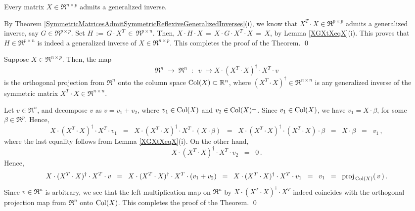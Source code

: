 \begin{theorem}
\mbox{}\vskip 0.1cm\noindent
Every matrix $X \in \Re^{n \times p}$ admits a generalized inverse.
\end{theorem}
\proof
By Theorem \ref{SymmetricMatricesAdmitSymmetricReflexiveGeneralizedInverses}(i),
we know that $X^{T} \cdot X \in \Re^{p \times p}$ admits a generalized inverse, say $G \in \Re^{p \times p}$.
Set $H \,:=\, G \cdot X^{T} \,\in\, \Re^{p \times n}$.
Then, $X \cdot H \cdot X \,=\, X \cdot G \cdot X^{T} \cdot X \,=\, X$, by Lemma \ref{XGXtXeqX}(i).
This proves that $H \in \Re^{p \times n}$ is indeed a generalized inverse of $X \in \Re^{n \times p}$.
This completes the proof of the Theorem.
\qed

\begin{theorem}
\mbox{}\vskip 0.1cm\noindent
Suppose $X \in \Re^{n \times p}$.
Then, the map
\begin{equation*}
\Re^{n} \; \longrightarrow \; \Re^{n}
\;\; : \;\;
v \; \longmapsto X \cdot (X^{T} \cdot X)^{\dagger} \cdot X^{T} \cdot v
\end{equation*}
is the orthogonal projection from $\Re^{n}$ onto the column space
$\textnormal{Col}(X) \subset \mathbb{R}^{n}$, where
$(X^{T} \cdot X)^{\dagger} \in \Re^{n \times n}$ is any generalized inverse of the symmetric
matrix $X^{T} \cdot X \in \Re^{n \times n}$.
\end{theorem}
\proof
Let $v \in \Re^{n}$, and decompose $v$ as $v = v_{1} + v_{2}$,
where $v_{1} \in \textnormal{Col}(X)$ and $v_{2} \in \textnormal{Col}(X)^{\perp}$.
Since $v_{1} \in \textnormal{Col}(X)$, we have $v_{1} = X\cdot\beta$,
for some $\beta \in \Re^{p}$.
Hence,
\begin{equation*}
X \cdot (X^{T} \cdot X)^{\dagger} \cdot X^{T} \cdot v_{1}
\;\; = \;\;
	X \cdot (X^{T} \cdot X)^{\dagger} \cdot X^{T} \cdot (X \cdot \beta)
\;\; = \;\;
	X \cdot (X^{T} \cdot X)^{\dagger} \cdot (X^{T} \cdot X) \cdot \beta
\;\; = \;\;
	X \cdot \beta
\;\; = \;\;
	v_{1}\,,
\end{equation*}
where the last equality follows from Lemma \ref{XGXtXeqX}(i).
On the other hand,
\begin{equation*}
X \cdot (X^{T} \cdot X)^{\dagger} \cdot X^{T} \cdot v_{2}
\;\; = \;\;
	0\,.
\end{equation*}
Hence,
\begin{equation*}
X \cdot (X^{T} \cdot X)^{\dagger} \cdot X^{T} \cdot v
\;\; = \;\;
	X \cdot (X^{T} \cdot X)^{\dagger} \cdot X^{T} \cdot (v_{1} + v_{2})
\;\; = \;\;
	X \cdot (X^{T} \cdot X)^{\dagger} \cdot X^{T} \cdot v_{1}
\;\; = \;\;
	v_{1}
\;\; = \;\;
	\textnormal{proj}_{\,\textnormal{Col}(X)}(\,v\,)\,.
\end{equation*}
Since $v \in \Re^{n}$ is arbitrary, we see that the left multiplication map on $\Re^{n}$
by $X \cdot (X^{T} \cdot X)^{\dagger} \cdot X^{T}$ indeed coincides with the
orthogonal projection map from $\Re^{n}$ onto $\textnormal{Col}(X)$.
This completes the proof of the Theorem.
\qed


